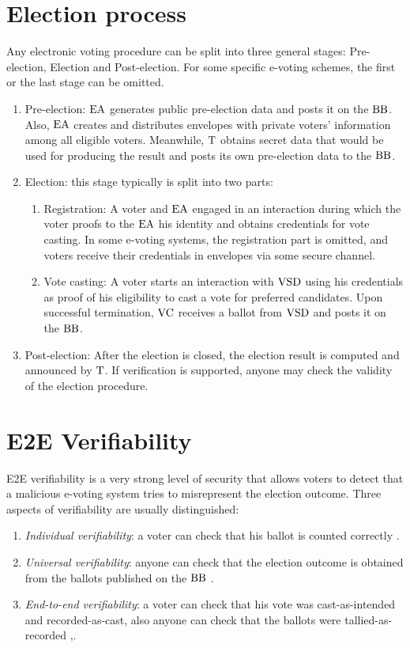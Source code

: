 \section{Election process}
Any electronic voting procedure can be split into three general stages: Pre-election, Election and Post-election. For some specific e-voting schemes, the first or the last stage can be omitted.
\begin{enumerate}
\item Pre-election: $\operatorname{EA}$ generates public pre-election data and posts it on the $\operatorname{BB}$. Also, $\operatorname{EA}$ creates and distributes envelopes with private voters' information among all eligible voters. Meanwhile, $\operatorname{T}$ obtains secret data that would be used for producing the result and posts its own pre-election data to the $\operatorname{BB}$.
\item Election: this stage typically is split into two parts:
\begin{enumerate}
\item Registration: A voter and $\operatorname{EA}$ engaged in an interaction during which the voter proofs to the $\operatorname{EA}$ his identity and obtains credentials for vote casting. In some e-voting systems, the registration part is omitted, and voters receive their credentials in envelopes via some secure channel. 
\item Vote casting: A voter starts an interaction with $\operatorname{VSD}$ using his credentials as proof of his eligibility to cast a vote for preferred candidates. Upon successful termination, $\operatorname{VC}$ receives a ballot from $\operatorname{VSD}$ and posts it on the $\operatorname{BB}$. 
\end{enumerate}
\item Post-election: After the election is closed, the election result is computed and announced by $\operatorname{T}$.  If verification is supported, anyone may check the validity of the election procedure. 
\end{enumerate}

\section{E2E Verifiability}
E2E verifiability is a very strong level of security that allows voters  to detect that a malicious e-voting system tries to misrepresent the election outcome. Three aspects of verifiability are usually distinguished:
\begin{enumerate}
\item \textit{Individual verifiability}: a voter can check that his ballot is counted correctly \cite{Chaum1981}.
\item \textit{Universal verifiability}: anyone can check that the election outcome is obtained from the ballots published on the $\operatorname{BB}$ \cite{Sako1995}.
\item \textit{End-to-end verifiability}: a voter can check that his vote was cast-as-intended and recorded-as-cast, also anyone can check that the ballots were tallied-as-recorded \cite{Neff2004},\cite{Chaum2004}.
\end{enumerate}

